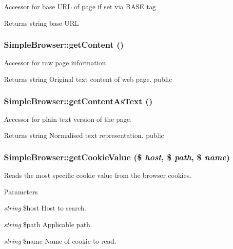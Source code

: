 \label{class_simple_browser_ade478f581d42d5c7fafbc62015a8c5b2}
Accessor for base URL of page if set via BASE tag \begin{DoxyReturn}{Returns}
string base URL 
\end{DoxyReturn}
\hypertarget{class_simple_browser_acd4adb18386b0d8e001b1dd91ee23dbd}{
\subsubsection[{getContent}]{\setlength{\rightskip}{0pt plus 5cm}SimpleBrowser::getContent ()}}
\label{class_simple_browser_acd4adb18386b0d8e001b1dd91ee23dbd}
Accessor for raw page information. \begin{DoxyReturn}{Returns}
string Original text content of web page.  public 
\end{DoxyReturn}
\hypertarget{class_simple_browser_ab303ac172fd3982ad42a939ba78abb5b}{
\subsubsection[{getContentAsText}]{\setlength{\rightskip}{0pt plus 5cm}SimpleBrowser::getContentAsText ()}}
\label{class_simple_browser_ab303ac172fd3982ad42a939ba78abb5b}
Accessor for plain text version of the page. \begin{DoxyReturn}{Returns}
string Normalised text representation.  public 
\end{DoxyReturn}
\hypertarget{class_simple_browser_a3af84b937fb74b4e53b636b2aa417c90}{
\subsubsection[{getCookieValue}]{\setlength{\rightskip}{0pt plus 5cm}SimpleBrowser::getCookieValue (\$ {\em host}, \/  \$ {\em path}, \/  \$ {\em name})}}
\label{class_simple_browser_a3af84b937fb74b4e53b636b2aa417c90}
Reads the most specific cookie value from the browser cookies. 
\begin{DoxyParams}{Parameters}
\item[{\em string}]\$host Host to search. \item[{\em string}]\$path Applicable path. \item[{\em string}]\$name Name of cookie to read. \end{DoxyParams}
